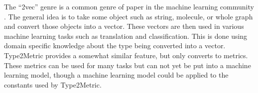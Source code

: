 The ``2vec'' genre is a common genre of paper in the machine learning community \cite{mikolov2013distributed,jaeger2018mol2vec}.
The general idea is to take some object such as string, molecule, or whole graph and convert those objects into a vector.
These vectors are then used in various machine learning tasks such as translation and classification.
This is done using domain specific knowledge about the type being converted into a vector.
Type2Metric provides a somewhat similar feature, but only converts to metrics. 
These metrics can be used for many tasks but can not yet be put into a machine learning model,
though a machine learning model could be applied to the constants used by Type2Metric.